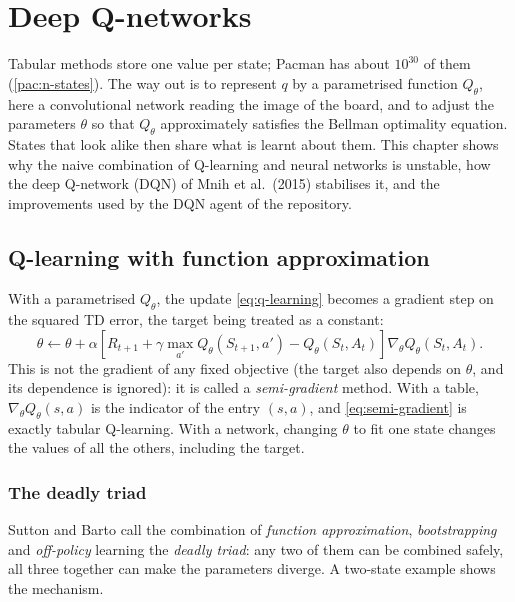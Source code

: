 \chapter{Deep Q-networks}
\label{ch:dqn}

Tabular methods store one value per state; Pacman has about $10^{30}$ of
them (\cref{pac:n-states}). The way out is to represent $q$ by a
parametrised function $Q_\theta$, here a convolutional network reading the
image of the board, and to adjust the parameters $\theta$ so that
$Q_\theta$ approximately satisfies the Bellman optimality equation. States
that look alike then share what is learnt about them. This chapter shows why
the naive combination of Q-learning and neural networks is unstable, how the
deep Q-network (DQN) of Mnih et al.\ (2015) stabilises it, and the
improvements used by the DQN agent of the repository.

\section{Q-learning with function approximation}

With a parametrised $Q_\theta$, the update \eqref{eq:q-learning} becomes a
gradient step on the squared TD error, the target being treated as a
constant:
\begin{equation}
  \label{eq:semi-gradient}
  \theta \gets \theta + \alpha \left[ R_{t+1} + \gamma \max_{a'}
    Q_\theta(S_{t+1}, a') - Q_\theta(S_t, A_t) \right]
    \nabla_\theta Q_\theta(S_t, A_t).
\end{equation}
This is not the gradient of any fixed objective (the target also depends on
$\theta$, and its dependence is ignored): it is called a
\emph{semi-gradient} method. With a table, $\nabla_\theta Q_\theta(s, a)$
is the indicator of the entry $(s, a)$, and \eqref{eq:semi-gradient} is
exactly tabular Q-learning. With a network, changing $\theta$ to fit one
state changes the values of all the others, including the target.

\subsection{The deadly triad}

Sutton and Barto call the combination of \emph{function approximation},
\emph{bootstrapping} and \emph{off-policy} learning the \emph{deadly
triad}: any two of them can be combined safely, all three together can
make the parameters diverge. A two-state example shows the mechanism.

